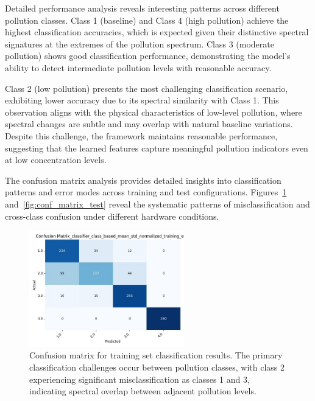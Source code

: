 Detailed performance analysis reveals interesting patterns across different pollution classes. Class 1 (baseline) and Class 4 (high pollution) achieve the highest classification accuracies, which is expected given their distinctive spectral signatures at the extremes of the pollution spectrum. Class 3 (moderate pollution) shows good classification performance, demonstrating the model's ability to detect intermediate pollution levels with reasonable accuracy.

Class 2 (low pollution) presents the most challenging classification scenario, exhibiting lower accuracy due to its spectral similarity with Class 1. This observation aligns with the physical characteristics of low-level pollution, where spectral changes are subtle and may overlap with natural baseline variations. Despite this challenge, the framework maintains reasonable performance, suggesting that the learned features capture meaningful pollution indicators even at low concentration levels.

The confusion matrix analysis provides detailed insights into classification patterns and error modes across training and test configurations. Figures~\ref{fig:conf_matrix_train} and~\ref{fig:conf_matrix_test} reveal the systematic patterns of misclassification and cross-class confusion under different hardware conditions.

\begin{figure}[H]
\centering
\includegraphics[width=0.6\textwidth]{out/class_based_mean_std_normalized/confusion_matrix_classifier_class_based_mean_std_normalized_training_eval.jpg}
\caption{Confusion matrix for training set classification results. The primary classification challenges occur between pollution classes, with class 2 experiencing significant misclassification as classes 1 and 3, indicating spectral overlap between adjacent pollution levels.}
\label{fig:conf_matrix_train}
\end{figure}

